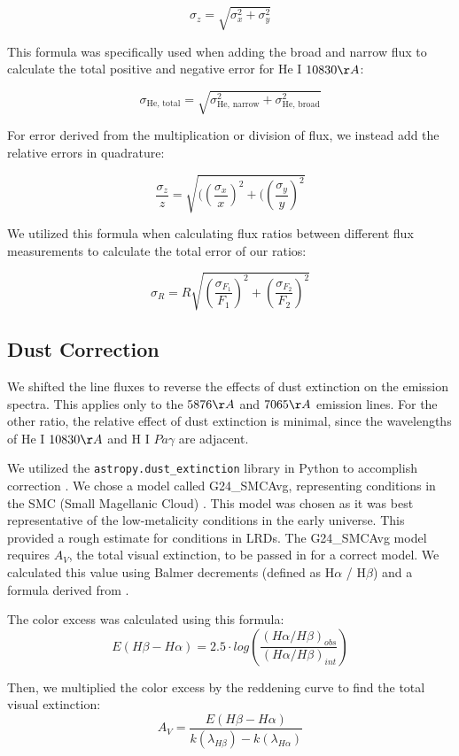 \documentclass[letterpaper]{aastex701}
\begin{document}
\[\sigma_z = \sqrt{\sigma_x^2+\sigma_y^2}\]

This formula was specifically used when adding the broad and narrow flux to calculate the total positive and negative error for He I $10830\AA$:

\[\sigma_{\mathrm{He,\,total}} = \sqrt{\sigma_{\mathrm{He,\,narrow}}^2 + \sigma_{\mathrm{He,\,broad}}^2}\]

For error derived from the multiplication or division of flux, we instead add the relative errors in quadrature:

\[\frac{\sigma_z}{z} = \sqrt{(\left(\frac{\sigma_x}{x}\right)^2+(\left(\frac{\sigma_y}{y}\right)^2}\]

We utilized this formula when calculating flux ratios between different flux measurements to calculate the total error of our ratios:

\[
\sigma_R = 
R\sqrt{\left(\frac{\sigma_{F_1}}{F_1}\right)^2 + 
\left(\frac{\sigma_{F_2}}{F_2}\right)^2}
\]

\subsection{Dust Correction}

We shifted the line fluxes to reverse the effects of dust extinction on the emission spectra. This applies only to the $5876\AA$ and $7065\AA$ emission lines. For the other ratio, the relative effect of dust extinction is minimal, since the wavelengths of He I $10830\AA$ and H I $Pa\gamma$ are adjacent. 

We utilized the \texttt{astropy.dust\_extinction} library in Python to accomplish correction \citep{Gordon2024}. We chose a model called G24\_SMCAvg, representing conditions in the SMC (Small Magellanic Cloud) \citep{2024ApJ...970...51G}. This model was chosen as it was best representative of the low-metalicity conditions in the early universe. This provided a rough estimate for conditions in LRDs. The G24\_SMCAvg model requires $A_V$, the total visual extinction, to be passed in for a correct model. We calculated this value using Balmer decrements (defined as H$\alpha$ / H$\beta$) and a formula derived from \citet{2016ApJ...817L...9N}.

The color excess was calculated using this formula:
\[E(H\beta - H\alpha) = 2.5 \cdot log(\frac{(H\alpha/H\beta)_{obs}}{(H\alpha/H\beta)_{int}})\]

Then, we multiplied the color excess by the reddening curve to find the total visual extinction:
\[A_V = \frac{E(H\beta - H\alpha)}{k(\lambda_{H\beta}) - k(\lambda_{H\alpha})}\]
\end{document}
